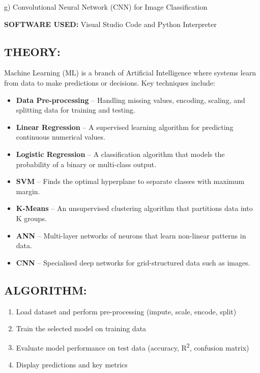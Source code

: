 \documentclass[12pt,a4paper]{article}
\begin{document}
g) Convolutional Neural Network (CNN) for Image Classification

\textbf{SOFTWARE USED:} Visual Studio Code and Python Interpreter

\subsection{THEORY:}

Machine Learning (ML) is a branch of Artificial Intelligence where systems learn from data to make predictions or decisions. Key techniques include:

\begin{itemize}
    \item \textbf{Data Pre-processing} -- Handling missing values, encoding, scaling, and splitting data for training and testing.
    \item \textbf{Linear Regression} -- A supervised learning algorithm for predicting continuous numerical values.
    \item \textbf{Logistic Regression} -- A classification algorithm that models the probability of a binary or multi-class output.
    \item \textbf{SVM} -- Finds the optimal hyperplane to separate classes with maximum margin.
    \item \textbf{K-Means} -- An unsupervised clustering algorithm that partitions data into K groups.
    \item \textbf{ANN} -- Multi-layer networks of neurons that learn non-linear patterns in data.
    \item \textbf{CNN} -- Specialised deep networks for grid-structured data such as images.
\end{itemize}

\subsection{ALGORITHM:}

\begin{enumerate}
    \item Load dataset and perform pre-processing (impute, scale, encode, split)
    \item Train the selected model on training data
    \item Evaluate model performance on test data (accuracy, R\textsuperscript{2}, confusion matrix)
    \item Display predictions and key metrics
\end{enumerate}
\end{document}
